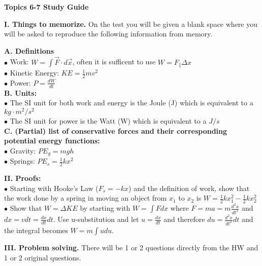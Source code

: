 \documentclass[11pt]{article}
\begin{document}
{\centering
\textbf{Topics 6-7 Study Guide} \par
\vspace{\baselineskip}
}

\textbf{I. Things to memorize.}
On the test you will be given a blank space where you will be asked to reproduce the following information from memory.
\vspace{0.5\baselineskip}

\begin{addmargin}[1em]{0em}%
\textbf{A. Definitions} \\
$\bullet$ Work: $W = \int \vec{F} \cdot d\vec{x}$, often it is sufficent to use $W = F_\parallel \Delta x$ \\
$\bullet$ Kinetic Energy: $KE = \frac{1}{2} m v^2$ \\
$\bullet$ Power: $P = \frac{dW}{dt}$ \\

\textbf{B. Units:} \\
$\bullet$ The SI unit for both work and energy is the Joule (J) which is equivalent to a $kg \cdot m^2/s^2$ \\
$\bullet$ The SI unit for power is the Watt (W) which is equivalent to a $J/s$ \\

\textbf{C. (Partial) list of conservative forces and their corresponding potential energy functions:} \\
$\bullet$ Gravity: $PE_g = mgh$ \\
$\bullet$ Springs: $PE_s = \frac{1}{2}kx^2$
\end{addmargin}

\vspace{\baselineskip}
\textbf{II. Proofs:} \\
$\bullet$ Starting with Hooke's Law ($F_s = -kx$) and the definition of work, show that the work done by a spring in moving an object from $x_1$ to $x_2$ is $W = \frac{1}{2}kx_1^2 - \frac{1}{2}kx_2^2$ \\
$\bullet$ Show that $W = \Delta KE$ by starting with $W = \int F dx$ where $F = ma = m\frac{d^2x}{dt^2}$ and $dx = vdt = \frac{dx}{dt}dt$. Use u-substitution and let $u = \frac{dx}{dt}$ and therefore $du = \frac{d^2x}{dt^2}dt$ and the integral becomes $W = m \int u du$.

\vspace{\baselineskip}
\textbf{III. Problem solving.}
There will be 1 or 2 questions directly from the HW and 1 or 2 original questions.
\end{document}
